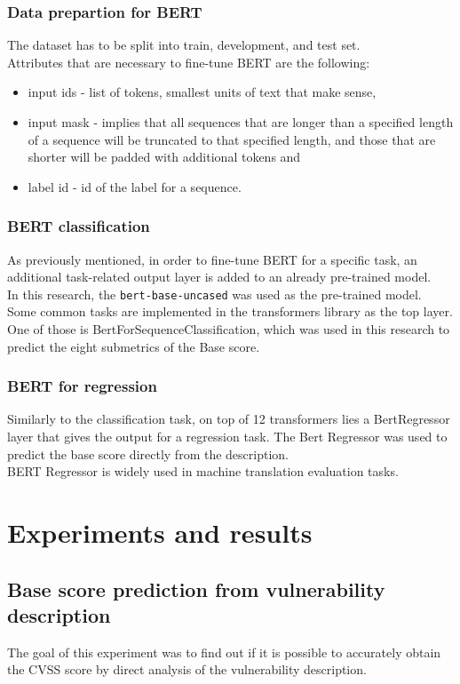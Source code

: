 \documentclass[times, utf8, zavrsni, english]{fer}
\begin{document}
\subsection{Data prepartion for BERT}
The dataset has to be split into train, development, and test set.\\
Attributes that are necessary to fine-tune BERT are the following:
\begin{itemize}
	\item input ids - list of tokens, smallest units of text that make sense,
	\item  input mask - implies that all sequences that are longer than a specified length of a sequence will be truncated to that specified length, and those that are shorter will be padded with additional tokens and
	\item label id - id of the label for a sequence.
\end{itemize}
 
\subsection{BERT classification}
As previously mentioned, in order to fine-tune BERT for a specific task, an additional task-related output layer is added to an already pre-trained model.\\
In this research, the \texttt{bert-base-uncased} was used as the pre-trained model.\\
Some common tasks are implemented in the transformers library as the top layer. One of those is BertForSequenceClassification, which was used in this research to predict the eight submetrics of the Base score. 
\subsection{BERT for regression}
Similarly to the classification task, on top of 12 transformers lies a BertRegressor layer that gives the output for a regression task. The Bert Regressor was used to predict the base score directly from the description.\\
BERT Regressor is widely used in machine translation evaluation tasks. \citep{shimanaka}

\chapter{Experiments and results}
\section{Base score prediction from vulnerability description}
The goal of this experiment was to find out if it is possible to accurately obtain the CVSS score by direct analysis of the vulnerability description.
\end{document}

